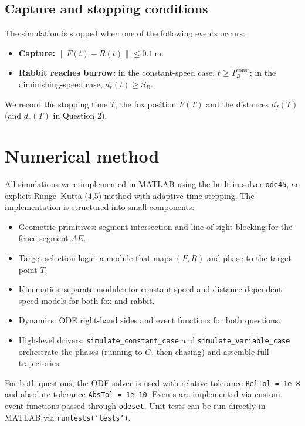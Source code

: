 \documentclass[a4paper,11pt]{article}
\begin{document}
\subsection{Capture and stopping conditions}

The simulation is stopped when one of the following events occurs:
\begin{itemize}
  \item \textbf{Capture:} $\|F(t)-R(t)\| \leq \SI{0.1}{\metre}$.
  \item \textbf{Rabbit reaches burrow:} in the constant-speed case, $t \geq T_B^{\text{const}}$; in the diminishing-speed case, $d_r(t)\geq S_B$.
\end{itemize}
We record the stopping time $T$, the fox position $F(T)$ and the distances $d_f(T)$ (and $d_r(T)$ in Question 2).

\section{Numerical method}

All simulations were implemented in \textsc{MATLAB} using the built-in solver \texttt{ode45}, an explicit Runge--Kutta (4,5) method with adaptive time stepping. The implementation is structured into small components:

\begin{itemize}
  \item Geometric primitives: segment intersection and line-of-sight blocking for the fence segment $AE$.
  \item Target selection logic: a module that maps $(F,R)$ and phase to the target point $T$.
  \item Kinematics: separate modules for constant-speed and distance-dependent-speed models for both fox and rabbit.
  \item Dynamics: ODE right-hand sides and event functions for both questions.
  \item High-level drivers: \texttt{simulate\_constant\_case} and \texttt{simulate\_variable\_case} orchestrate the phases (running to $G$, then chasing) and assemble full trajectories.
\end{itemize}

For both questions, the ODE solver is used with relative tolerance \texttt{RelTol = 1e-8} and absolute tolerance \texttt{AbsTol = 1e-10}. Events are implemented via custom event functions passed through \texttt{odeset}. Unit tests can be run directly in \textsc{MATLAB} via \texttt{runtests('tests')}.
\end{document}

